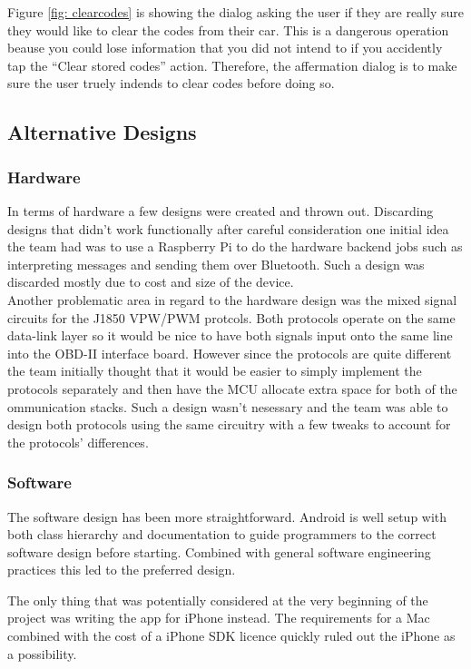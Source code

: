 \documentclass[12pt,letterpaper]{article}
\begin{document}
Figure \ref{fig: clearcodes} is showing the dialog asking the user if
they are really sure they would like to clear the codes from their
car. This is a dangerous operation beause you could lose information
that you did not intend to if you accidently tap the ``Clear stored
codes'' action. Therefore, the affermation dialog is to make sure the
user truely indends to clear codes before doing so.

\subsection{Alternative Designs}
\subsubsection{Hardware}
In terms of hardware a few designs were created and thrown out. Discarding designs that didn't work functionally after careful consideration one initial idea the team had was to use a Raspberry Pi to do the hardware backend jobs such as interpreting messages and sending them over Bluetooth. Such a design was discarded mostly due to cost and size of the device.\\ 

Another problematic area in regard to the hardware design was the mixed signal circuits for the J1850 VPW/PWM protcols. Both protocols operate on the same data-link layer so it would be nice to have both signals input onto the same line into the OBD-II interface board. However since the protocols are quite different the team initially thought that it would be easier to simply implement the protocols separately and then have the MCU allocate extra space for both of the ommunication stacks. Such a design wasn't nesessary and the team was able to design both protocols using the same circuitry with a few tweaks to account for the protocols' differences.

\subsubsection{Software}
The software design has been more straightforward. Android is well setup with both class hierarchy and documentation to guide programmers to the correct software design before starting. Combined with general software engineering practices this led to the preferred design. 

The only thing that was potentially considered at the very beginning of the project was writing the app for iPhone instead. The requirements for a Mac combined with the cost of a iPhone SDK licence quickly ruled out the iPhone as a possibility. 
\end{document}
